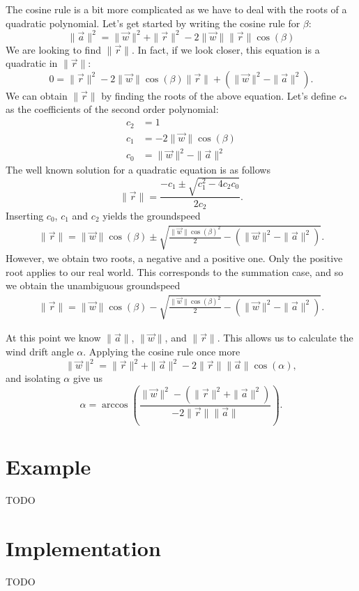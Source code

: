 \documentclass[a4paper,10pt]{article}
\begin{document}
The cosine rule is a bit more complicated as we have to deal with the roots of a quadratic polynomial.
Let's get started by writing the cosine rule for $\beta$:
\begin{equation}
 \|\vec{a}\|^2 = \|\vec{w}\|^2 + \|\vec{r}\|^2 - 2 \|\vec{w}\| \|\vec{r}\| \cos(\beta)
\end{equation}
We are looking to find $\|\vec{r}\|$. In fact, if we look closer, this equation is a quadratic in $\|\vec{r}\|$:
\begin{equation}
 0 =  \|\vec{r}\|^2 - 2 \|\vec{w}\| \cos(\beta) \|\vec{r}\| + (\|\vec{w}\|^2 - \|\vec{a}\|^2).
\end{equation}
We can obtain $\|\vec{r}\|$ by finding the roots of the above equation.
Let's define $c_*$ as the coefficients of the second order polynomial:
\begin{subequations}
\begin{align}
 c_2 &= 1\\
 c_1 &= - 2 \|\vec{w}\| \cos(\beta)\\
 c_0 &= \|\vec{w}\|^2 -\|\vec{a}\|^2
\end{align}
\end{subequations}
The well known solution for a quadratic equation is as follows
\begin{equation}
 \|\vec{r}\| = \frac{-c_1\pm\sqrt{c_1^2-4c_2c_0}}{2c_2}.
\end{equation}
Inserting $c_0$, $c_1$ and $c_2$ yields the groundspeed
\begin{align}
 \|\vec{r}\| = \|\vec{w}\| \cos(\beta)\pm\sqrt{\frac{\|\vec{w}\| \cos(\beta)^2}{2}-(\|\vec{w}\|^2 -\|\vec{a}\|^2)}.
\end{align}
However, we obtain two roots, a negative and a positive one.
Only the positive root applies to our real world.
This corresponds to the summation case, and so we obtain the unambiguous groundspeed
\begin{align}
 \|\vec{r}\| = \|\vec{w}\| \cos(\beta)-\sqrt{\frac{\|\vec{w}\| \cos(\beta)^2}{2}-(\|\vec{w}\|^2 -\|\vec{a}\|^2)}.
\end{align}

At this point we know $\|\vec{a}\|$, $\|\vec{w}\|$, and $\|\vec{r}\|$.
This allows us to calculate the wind drift angle $\alpha$.
Applying the cosine rule once more
\begin{equation}
 \|\vec{w}\|^2 = \|\vec{r}\|^2 + \|\vec{a}\|^2 - 2 \|\vec{r}\|\|\vec{a}\| \cos(\alpha),
\end{equation}
and isolating $\alpha$ give us
\begin{equation}
 \alpha = \arccos\left(\frac{\|\vec{w}\|^2-(\|\vec{r}\|^2 + \|\vec{a}\|^2)}{- 2 \|\vec{r}\|\|\vec{a}\|}\right).
\end{equation}


\section{Example}

TODO

\section{Implementation}

TODO
\end{document}
